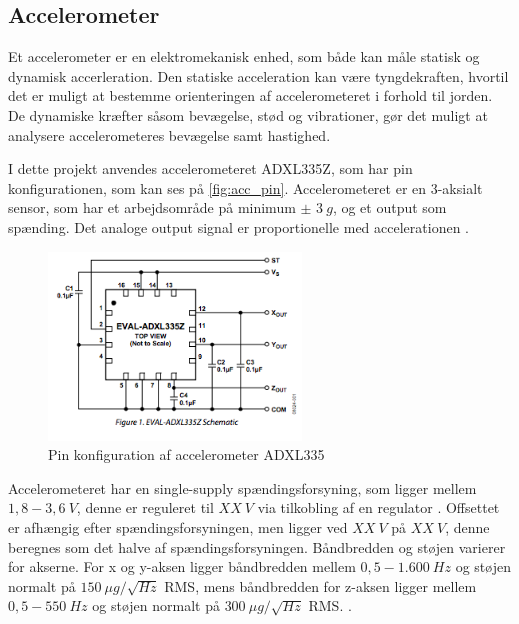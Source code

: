 \subsection{Accelerometer}
Et accelerometer er en elektromekanisk enhed, som både kan måle statisk og dynamisk accerleration. Den statiske acceleration kan være tyngdekraften, hvortil det er muligt at bestemme orienteringen af accelerometeret i forhold til jorden. De dynamiske kræfter såsom bevægelse, stød og vibrationer, gør det muligt at analysere accelerometeres bevægelse samt hastighed. 

I dette projekt anvendes accelerometeret ADXL335Z, som har pin konfigurationen, som kan ses på \autoref{fig:acc_pin}. Accelerometeret er en 3-aksialt sensor, som har et arbejdsområde på minimum $\pm$ $3~g$, og et output som spænding. Det analoge output signal er proportionelle med accelerationen \citep{analogdevices2009}. 


\begin{figure}[H]
\centering
\includegraphics[width=0.6\textwidth]{figures/acc_pin.png}
\caption{Pin konfiguration af accelerometer ADXL335 \citep{analogdevices2009}}
\label{fig:acc_pin}
\end{figure}

\noindent
Accelerometeret har en single-supply spændingsforsyning, som ligger mellem $1,8 - 3,6~V$, denne er reguleret til $XX~V$ via tilkobling af en regulator . Offsettet er afhængig efter spændingsforsyningen, men ligger ved $XX~V$ på $XX~V$, denne beregnes som det halve af spændingsforsyningen. Båndbredden og støjen varierer for akserne. For x og y-aksen ligger båndbredden mellem $0,5 - 1.600~Hz$ og støjen normalt på $150~\mu g/\sqrt{Hz}$ RMS, mens båndbredden for z-aksen ligger mellem $0,5 - 550~Hz$ og støjen normalt på $300~\mu g/\sqrt{Hz}$ RMS.  \citep{analogdevices2010}. 

